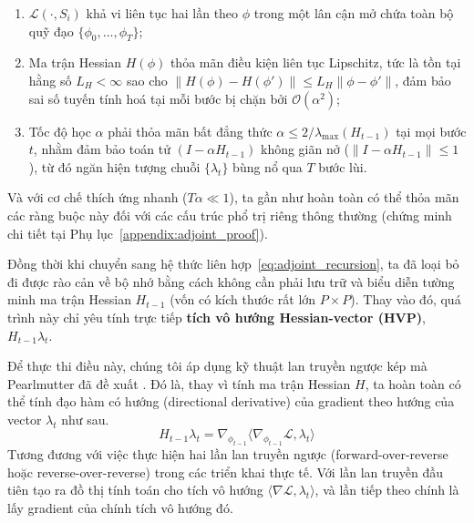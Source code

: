\begin{assumption}
\label{asm:adjoint_stability}
\leavevmode\newline\vspace{0.25em}
\begin{enumerate}[label=(\roman*)]
    \item $\mathcal{L}(\cdot, S_i)$ khả vi liên tục hai lần theo $\phi$ trong một lân cận mở chứa toàn bộ quỹ đạo $\{\phi_0, \dots, \phi_T\}$;
    \item Ma trận Hessian $H(\phi)$ thỏa mãn điều kiện liên tục Lipschitz, tức là tồn tại hằng số $L_H < \infty$ sao cho $\|H(\phi) - H(\phi')\| \le L_H \|\phi - \phi'\|$, đảm bảo sai số tuyến tính hoá tại mỗi bước bị chặn bởi $\mathcal{O}(\alpha^2)$;
    \item Tốc độ học $\alpha$ phải thỏa mãn bất đẳng thức $\alpha \le 2/\lambda_{\max}(H_{t-1})$ tại mọi bước $t$, nhằm đảm bảo toán tử $(I - \alpha H_{t-1})$ không giãn nở ($\|I - \alpha H_{t-1}\| \le 1$), từ đó ngăn hiện tượng chuỗi $\{\lambda_t\}$ bùng nổ qua $T$ bước lùi.
\end{enumerate}
\end{assumption}
Và với cơ chế thích ứng nhanh ($T\alpha \ll 1$), ta gần như hoàn toàn có thể thỏa mãn các ràng buộc này đối với các cấu trúc phổ trị riêng thông thường (chứng minh chi tiết tại Phụ lục~\ref{appendix:adjoint_proof}). 

Đồng thời khi chuyển sang hệ thức liên hợp~\eqref{eq:adjoint_recursion}, ta đã loại bỏ đi được rào cản về bộ nhớ bằng cách không cần phải lưu trữ và biểu diễn tường minh ma trận Hessian $H_{t-1}$ (vốn có kích thước rất lớn $P \times P$). Thay vào đó, quá trình này chỉ yêu tính trực tiếp \textbf{tích vô hướng Hessian-vector (HVP)}, $H_{t-1}\lambda_t$.

Để thực thi điều này, chúng tôi áp dụng kỹ thuật lan truyền ngược kép mà Pearlmutter đã đề xuất \cite{pearlmutter1994fast}. Đó là, thay vì tính ma trận Hessian $H$, ta hoàn toàn có thể tính đạo hàm có hướng (directional derivative) của gradient theo hướng của vector $\lambda_t$ như sau.
\begin{equation}
    H_{t-1}\lambda_t = \nabla_{\phi_{t-1}} \big\langle \nabla_{\phi_{t-1}} \mathcal{L}, \lambda_t \big\rangle
    \label{eq:hvp_trick}
\end{equation}
Tương đương với việc thực hiện hai lần lan truyền ngược (forward-over-reverse hoặc reverse-over-reverse) trong các triển khai thực tế. Với lần lan truyền đầu tiên tạo ra đồ thị tính toán cho tích vô hướng $\langle \nabla \mathcal{L}, \lambda_t \rangle$, và lần tiếp theo chính là lấy gradient của chính tích vô hướng đó.

